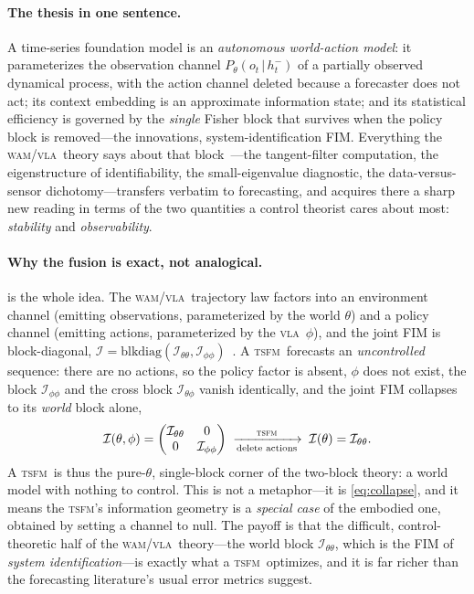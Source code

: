 \documentclass[10pt]{article}
\theoremstyle{plain}
\theoremstyle{definition}
\theoremstyle{remark}
\newcommand{\Fisher}{\mathcal{I}}
\newcommand{\Ith}{\Fisher_{\theta\theta}}
\newcommand{\Iph}{\Fisher_{\phi\phi}}
\newcommand{\Itp}{\Fisher_{\theta\phi}}
\newcommand{\given}{\,\vert\,}
\newcommand{\wm}{P_{\theta}}
\newcommand{\TSFM}{\textsc{tsfm}}
\newcommand{\WAM}{\textsc{wam}}
\newcommand{\VLA}{\textsc{vla}}
\begin{document}
\paragraph{The thesis in one sentence.}
A time-series foundation model is an \emph{autonomous world-action model}: it
parameterizes the observation channel $\wm(o_t\given h_t^-)$ of a partially
observed dynamical process, with the action channel deleted because a forecaster
does not act; its context embedding is an approximate information state; and its
statistical efficiency is governed by the \emph{single} Fisher block that
survives when the policy block is removed---the innovations,
system-identification FIM. Everything the \WAM/\VLA\ theory says about that
block~\cite{wamvla}---the tangent-filter computation, the eigenstructure of
identifiability, the small-eigenvalue diagnostic, the data-versus-sensor
dichotomy---transfers verbatim to forecasting, and acquires there a sharp new
reading in terms of the two quantities a control theorist cares about most:
\emph{stability} and \emph{observability}.

\paragraph{Why the fusion is exact, not analogical.}
 is the whole idea. The \WAM/\VLA\ trajectory law factors
into an environment channel (emitting observations, parameterized by the world
$\theta$) and a policy channel (emitting actions, parameterized by the \VLA\
$\phi$), and the joint FIM is block-diagonal, $\Fisher=\mathrm{blkdiag}(\Ith,
\Iph)$~\cite[Thm.~6.1]{wamvla}. A \TSFM\ forecasts an \emph{uncontrolled}
sequence: there are no actions, so the policy factor is absent, $\phi$ does not
exist, the block $\Iph$ and the cross block $\Itp$ vanish identically, and the
joint FIM collapses to its \emph{world} block alone,
\begin{equation}
 \Fisher(\theta,\phi)=\begin{pmatrix}\Ith & 0\\ 0 & \Iph\end{pmatrix}
 \;\xrightarrow[\text{delete actions}]{\ \TSFM\ }\;
 \Fisher(\theta)=\Ith .
 \label{eq:collapse}
\end{equation}
A \TSFM\ is thus the pure-$\theta$, single-block corner of the two-block theory:
a world model with nothing to control. This is not a metaphor---it is
\eqref{eq:collapse}, and it means the \TSFM's information geometry is a
\emph{special case} of the embodied one, obtained by setting a channel to null.
The payoff is that the difficult, control-theoretic half of the \WAM/\VLA\
theory---the world block $\Ith$, which is the FIM of \emph{system
identification}---is exactly what a \TSFM\ optimizes, and it is far richer than
the forecasting literature's usual error metrics suggest.
\end{document}
